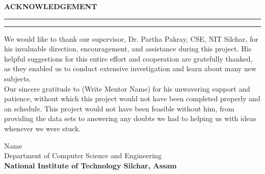\newpage
\thispagestyle{empty}

\begin{center}
\textbf{\LARGE{ACKNOWLEDGEMENT}}
\vspace{.1in}\hrule
\vspace{.05in}\hrule
\vspace{.4in}
\end{center}

\begin{justifying}
We would like to thank our supervisor, Dr. Partha Pakray, CSE, NIT Silchar, for his invaluable direction, encouragement, and assistance during this project. His helpful suggestions for this entire effort and cooperation are gratefully thanked, as they enabled us to conduct extensive investigation and learn about many new subjects.\\

Our sincere gratitude to (Write Mentor Name) for his unwavering support and patience, without which this project would not have been completed properly and on schedule. This project would not have been feasible without him, from providing the data sets to answering any doubts we had to helping us with ideas whenever we were stuck.\\
\end{justifying}
\vspace{1in}

\begin{center}
Name \\
\vspace{2in}
Department of Computer Science and Engineering\\
\textbf{National Institute of Technology Silchar, Assam}
\end{center}